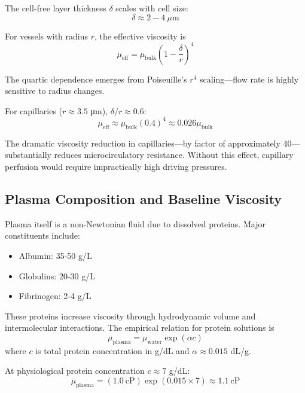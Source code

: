 The cell-free layer thickness $\delta$ scales with cell size:
\begin{equation}
\delta \approx 2-4~\mu\mathrm{m}
\end{equation}

For vessels with radius $r$, the effective viscosity is
\begin{equation}
\mu_{\mathrm{eff}} = \mu_{\mathrm{bulk}}\left(1 - \frac{\delta}{r}\right)^{4}
\end{equation}

The quartic dependence emerges from Poiseuille's $r^{4}$ scaling—flow rate is highly sensitive to radius changes.

For capillaries ($r \approx 3.5$ μm), $\delta/r \approx 0.6$:
\begin{equation}
\mu_{\mathrm{eff}} \approx \mu_{\mathrm{bulk}}(0.4)^{4} \approx 0.026\mu_{\mathrm{bulk}}
\end{equation}

The dramatic viscosity reduction in capillaries—by factor of approximately 40—substantially reduces microcirculatory resistance. Without this effect, capillary perfusion would require impractically high driving pressures.

\subsection{Plasma Composition and Baseline Viscosity}

Plasma itself is a non-Newtonian fluid due to dissolved proteins. Major constituents include:
\begin{itemize}
\item Albumin: 35-50 g/L
\item Globulins: 20-30 g/L
\item Fibrinogen: 2-4 g/L
\end{itemize}

These proteins increase viscosity through hydrodynamic volume and intermolecular interactions. The empirical relation for protein solutions is
\begin{equation}
\mu_{\mathrm{plasma}} = \mu_{\mathrm{water}} \exp(\alpha c)
\end{equation}
where $c$ is total protein concentration in g/dL and $\alpha \approx 0.015$ dL/g.

At physiological protein concentration $c \approx 7$ g/dL:
\begin{equation}
\mu_{\mathrm{plasma}} = (1.0~\mathrm{cP}) \exp(0.015 \times 7) \approx 1.1~\mathrm{cP}
\end{equation}

